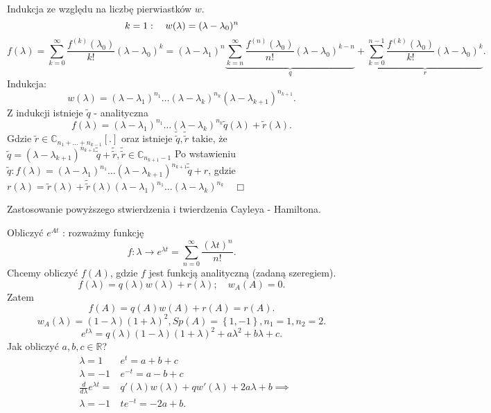 \documentclass[../main.tex]{subfiles}
\begin{document}
    \begin{dowod}
        Indukcja ze względu na liczbę pierwiastków $w$.
        \[
            k=1:\quad w(\lambda) = (\lambda-\lambda_0)^n\\
        \]
        \[
            f(\lambda) = \sum_{k=0}^{\infty} \frac{f^{(k)}(\lambda_0)}{k!}(\lambda-\lambda_0)^k = (\lambda - \lambda_1)^n \underbrace{\sum_{k=n}^{\infty} \frac{f^{(n)}(\lambda_0)}{n!}(\lambda - \lambda_0)^{k-n}}_q + \underbrace{\sum_{k=0}^{n-1} \frac{f^{(k)}(\lambda_0)}{k!}(\lambda-\lambda_0)^k}_r
        .\]
        Indukcja:
        \[
            w(\lambda) = (\lambda - \lambda_1)^{n_1} \ldots (\lambda - \lambda_k)^{n_k} (\lambda-\lambda_{k+1})^{n_{k+1}}
        .\]
        Z indukcji istnieje $\tilde q$ - analityczna
        \[
            f(\lambda) = (\lambda-\lambda_1)^{n_1}\ldots(\lambda-\lambda_k)^{n_k}\tilde q(\lambda) + \tilde r(\lambda)
        .\] Gdzie $\tilde r\in \mathbb{C}_{n_1+\ldots+n_{k-1}}[.]$ oraz istnieje $\tilde \tilde q, \tilde \tilde r$ takie, że $\tilde q = (\lambda-\lambda_{k+1})^{n_{k+1}} \tilde \tilde q + \tilde \tilde r, \tilde \tilde r\in \mathbb{C}_{n_{k+1}-1}$
        Po wstawieniu $\tilde q: f(\lambda)=(\lambda-\lambda_1)^{n_1}\ldots(\lambda-\lambda_{k+1})^{n_{k+1}}\tilde \tilde q+r$, gdzie $r(\lambda) = \tilde r(\lambda) + \tilde \tilde r(\lambda) (\lambda-\lambda_1)^{n_1}\ldots(\lambda-\lambda_k)^{n_k}\quad\Box$
    \end{dowod}
    Zastosowanie powyższego stwierdzenia i twierdzenia Cayleya - Hamiltona.

    \begin{przyklad}
        Obliczyć $e^{A t}$ : rozważmy funkcję
        \[
            f: \lambda \to e^{\lambda t} = \sum_{n=0}^{\infty} \frac{(\lambda t)^n}{n!}
        .\]
        Chcemy obliczyć $f(A)$, gdzie $f$ jest funkcją analityczną (zadaną szeregiem).
        \[
            f(\lambda) = q(\lambda)w(\lambda) + r(\lambda); \quad w_A(A) = 0
        .\]
        Zatem
        \[
            f(A) = q(A)w(A)+ r(A) = r(A)
        .\]
        \[
            w_A(\lambda) = (1-\lambda)(1+\lambda)^2, Sp(A) = \left\{ 1,-1 \right\} ,n_1=1,n_2=2
        .\]
\[
    e^{t \lambda} = q(\lambda) (1-\lambda)(1+\lambda)^2 + a\lambda^2+b\lambda+c
.\]
Jak obliczyć $a,b,c\in\mathbb{R}$?
\begin{align*}
    &\lambda=1 &e^t = a+b+c\\
    &\lambda=-1 &e^{-t} = a-b+c\\
    &\frac{d}{d\lambda}e^{\lambda t} = &q'(\lambda)w(\lambda) + qw'(\lambda)+2a\lambda + b\implies\\
    &\lambda = -1 &te^{- t} = -2a+b
.\end{align*}
    \end{przyklad}
\end{document}
